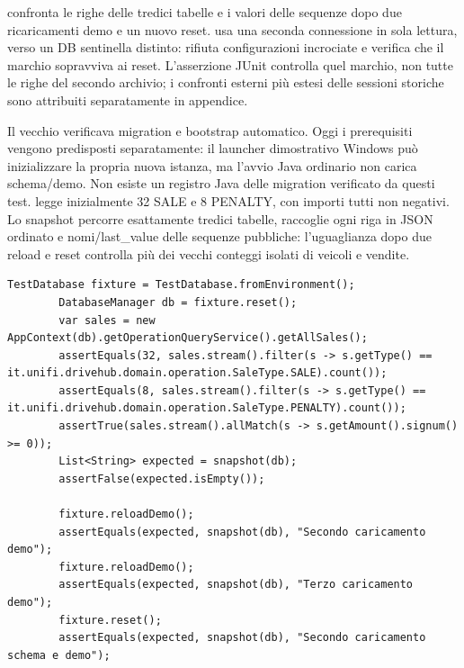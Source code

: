  confronta le righe delle tredici tabelle e i
valori delle sequenze dopo due ricaricamenti demo e un nuovo reset.
 usa una seconda connessione in
sola lettura, verso un DB sentinella distinto: rifiuta configurazioni
incrociate e verifica che il marchio  sopravviva ai reset.
L'asserzione JUnit controlla quel marchio, non tutte le righe del secondo
archivio; i confronti esterni più estesi delle sessioni storiche sono
attribuiti separatamente in appendice.

Il vecchio  verificava migration e
bootstrap automatico. Oggi i prerequisiti vengono predisposti separatamente:
il launcher dimostrativo Windows può inizializzare la propria nuova istanza,
ma l'avvio Java ordinario non carica schema/demo. Non esiste un registro Java
delle migration verificato da questi test.
 legge inizialmente 32 SALE e 8 PENALTY,
con importi tutti non negativi. Lo snapshot percorre esattamente tredici
tabelle, raccoglie ogni riga in JSON ordinato e nomi/last\_value delle
sequenze pubbliche: l'uguaglianza dopo due reload e reset controlla più
dei vecchi conteggi isolati di veicoli e vendite.

\noindent\begin{minipage}{\linewidth}
\begin{lstlisting}[firstnumber=17,caption={Fixture demo: tipi/importi e stabilità dopo ricaricamenti e reset.},label=lst:test-demo]
        TestDatabase fixture = TestDatabase.fromEnvironment();
        DatabaseManager db = fixture.reset();
        var sales = new AppContext(db).getOperationQueryService().getAllSales();
        assertEquals(32, sales.stream().filter(s -> s.getType() == it.unifi.drivehub.domain.operation.SaleType.SALE).count());
        assertEquals(8, sales.stream().filter(s -> s.getType() == it.unifi.drivehub.domain.operation.SaleType.PENALTY).count());
        assertTrue(sales.stream().allMatch(s -> s.getAmount().signum() >= 0));
        List<String> expected = snapshot(db);
        assertFalse(expected.isEmpty());

        fixture.reloadDemo();
        assertEquals(expected, snapshot(db), "Secondo caricamento demo");
        fixture.reloadDemo();
        assertEquals(expected, snapshot(db), "Terzo caricamento demo");
        fixture.reset();
        assertEquals(expected, snapshot(db), "Secondo caricamento schema e demo");
\end{lstlisting}
\end{minipage}


